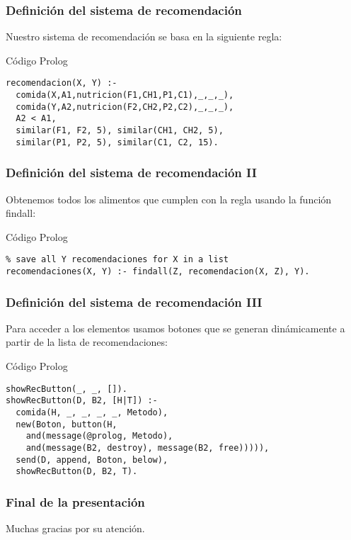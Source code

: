 \documentclass[aspectratio=169]{beamer}
\begin{document}
\begin{frame}[fragile]
\frametitle{Definición del sistema de recomendación}
Nuestro sistema de recomendación se basa en la siguiente regla:
\begin{block}{Código Prolog}
\begin{verbatim}
recomendacion(X, Y) :-
  comida(X,A1,nutricion(F1,CH1,P1,C1),_,_,_),
  comida(Y,A2,nutricion(F2,CH2,P2,C2),_,_,_),
  A2 < A1,
  similar(F1, F2, 5), similar(CH1, CH2, 5), 
  similar(P1, P2, 5), similar(C1, C2, 15).
\end{verbatim}
\end{block}
\end{frame}

\begin{frame}[fragile]
\frametitle{Definición del sistema de recomendación II}
Obtenemos todos los alimentos que cumplen con la regla usando la
función findall:

\begin{block}{Código Prolog}
\begin{verbatim}
% save all Y recomendaciones for X in a list
recomendaciones(X, Y) :- findall(Z, recomendacion(X, Z), Y).
\end{verbatim}
\end{block}
\end{frame}

\begin{frame}[fragile]
\frametitle{Definición del sistema de recomendación III}
Para acceder a los elementos usamos botones que se generan dinámicamente a partir de la lista de recomendaciones:

\begin{block}{Código Prolog}
\begin{verbatim}
showRecButton(_, _, []).
showRecButton(D, B2, [H|T]) :-
  comida(H, _, _, _, _, Metodo),
  new(Boton, button(H,
    and(message(@prolog, Metodo),
    and(message(B2, destroy), message(B2, free))))),
  send(D, append, Boton, below),
  showRecButton(D, B2, T).
\end{verbatim}
\end{block}
\end{frame}

\begin{frame}
\frametitle{Final de la presentación}

Muchas gracias por su atención.
\end{frame}
\end{document}
